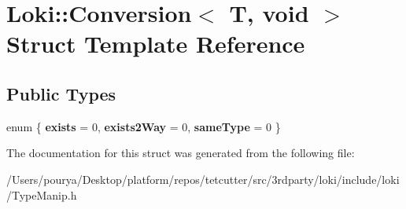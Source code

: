 \hypertarget{structLoki_1_1Conversion_3_01T_00_01void_01_4}{}\section{Loki\+:\+:Conversion$<$ T, void $>$ Struct Template Reference}
\label{structLoki_1_1Conversion_3_01T_00_01void_01_4}
\subsection*{Public Types}
\begin{DoxyCompactItemize}
\item 
\hypertarget{structLoki_1_1Conversion_3_01T_00_01void_01_4_a3ed44a55d97200b7b86456716f2f7e41}{}enum \{ {\bfseries exists} = 0, 
{\bfseries exists2\+Way} = 0, 
{\bfseries same\+Type} = 0
 \}\label{structLoki_1_1Conversion_3_01T_00_01void_01_4_a3ed44a55d97200b7b86456716f2f7e41}

\end{DoxyCompactItemize}


The documentation for this struct was generated from the following file\+:\begin{DoxyCompactItemize}
\item 
/\+Users/pourya/\+Desktop/platform/repos/tetcutter/src/3rdparty/loki/include/loki/Type\+Manip.\+h\end{DoxyCompactItemize}
